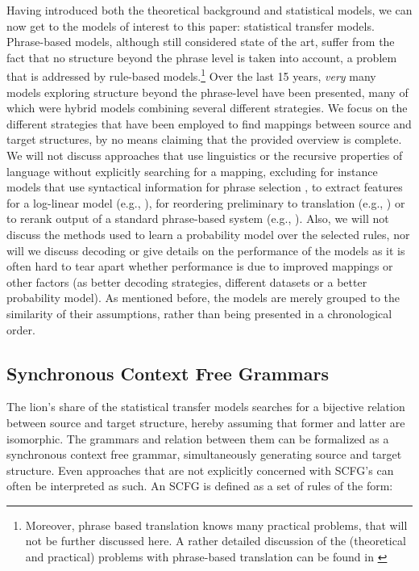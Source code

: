 \documentclass{report}
\theoremstyle{definition}
\theoremstyle{plain}
\begin{document}
Having introduced both the theoretical background and statistical models, we can now get to the models of interest to this paper: statistical transfer models. Phrase-based models, although still considered state of the art, suffer from the fact that no structure beyond the phrase level is taken into account, a problem that is addressed by rule-based models.\footnote{Moreover, phrase based translation knows many practical problems, that will not be further discussed here. A rather detailed discussion of the (theoretical and practical) problems with phrase-based translation can be found in \cite{quirk2006we}} Over the last 15 years, \textit{very} many models exploring structure beyond the phrase-level have been presented, many of which were hybrid models combining several different strategies. We focus on the different strategies that have been employed to find mappings between source and target structures, by no means claiming that the provided overview is complete. We will not discuss approaches that use linguistics or the recursive properties of language without explicitly searching for a mapping, excluding for instance models that use syntactical information for phrase selection \citep{koehn2003statistical}, to extract features for a log-linear model (e.g., \cite{cherry2013improved,liu2010semantic}), for reordering preliminary to translation (e.g., \cite{khalilov2012statistical}) or to rerank output of a standard phrase-based system (e.g., \cite{och2004smorgasbord}). Also, we will not discuss the methods used to learn a probability model over the selected rules, nor will we discuss decoding or give details on the performance of the models as it is often hard to tear apart whether performance is due to improved mappings or other factors (as better decoding strategies, different datasets or a better probability model). As mentioned before, the models are merely grouped to the similarity of their assumptions, rather than being presented in a chronological order.

\subsection{Synchronous Context Free Grammars}
The lion's share of the statistical transfer models searches for a bijective relation between source and target structure, hereby assuming that former and latter are isomorphic. The grammars and relation between them can be formalized as a synchronous context free grammar, simultaneously generating source and target structure. Even approaches that are not explicitly concerned with SCFG's can often be interpreted as such. An SCFG is defined as a set of rules of the form:
\end{document}
